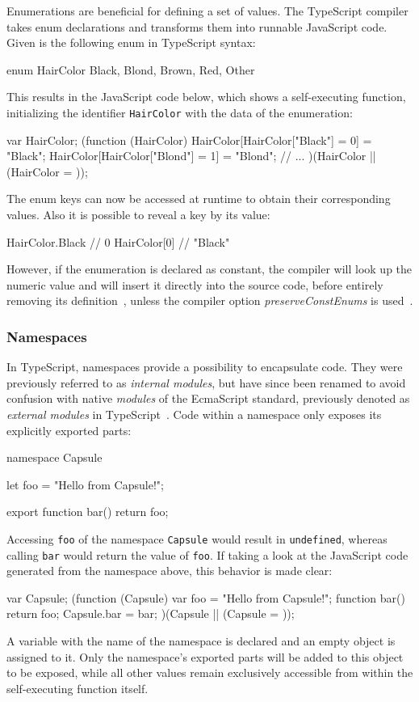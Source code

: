 Enumerations are beneficial for defining a set of values. The TypeScript compiler takes enum declarations and transforms them into runnable JavaScript code. Given is the following enum in TypeScript syntax:
\begin{JsCode}[numbers=none]
enum HairColor {
  Black, Blond, Brown, Red, Other
}
\end{JsCode}
This results in the JavaScript code below, which shows a self-executing function, initializing the identifier \texttt{HairColor} with the data of the enumeration:
\begin{JsCode}[numbers=none]
var HairColor;
(function (HairColor) {
    HairColor[HairColor["Black"] = 0] = "Black";
    HairColor[HairColor["Blond"] = 1] = "Blond";
    // ...
})(HairColor || (HairColor = {}));
\end{JsCode}
The enum keys can now be accessed at runtime to obtain their corresponding values. Also it is possible to reveal a key by its value:
\begin{JsCode}[numbers=none]
HairColor.Black // 0
HairColor[0] // "Black"
\end{JsCode}
However, if the enumeration is declared as constant, the compiler will look up the numeric value and will insert it directly into the source code, before entirely removing its definition~\cite{TypeScriptHandbook:Enums}, unless the compiler option \emph{preserveConstEnums} is used~\cite{TypeScriptHandbook:CompilerOptions}.

\enlargethispage{2\baselineskip}
\subsubsection{Namespaces}

In TypeScript, namespaces provide a possibility to encapsulate code. They were previously referred to as \emph{internal modules}, but have since been renamed to avoid confusion with native \emph{modules} of the EcmaScript standard, previously denoted as \emph{external modules} in TypeScript~\cite{TypeScriptHandbook:Namespaces}.
Code within a namespace only exposes its explicitly exported parts:
\begin{JsCode}[numbers=none]
namespace Capsule {
  let foo = "Hello from Capsule!";
  
  export function bar() {
    return foo;
  }
}
\end{JsCode}
Accessing \texttt{foo} of the namespace \texttt{Capsule} would result in \texttt{undefined}, whereas calling \texttt{bar} would return the value of \texttt{foo}. If taking a look at the JavaScript code generated from the namespace above, this behavior is made clear:
\begin{JsCode}[numbers=none]
var Capsule;
(function (Capsule) {
    var foo = "Hello from Capsule!";
    function bar() {
        return foo;
    }
    Capsule.bar = bar;
})(Capsule || (Capsule = {}));
\end{JsCode}
A variable with the name of the namespace is declared and an empty object is assigned to it. Only the namespace's exported parts will be added to this object to be exposed, while all other values 
remain exclusively accessible from within the self-executing function itself.

